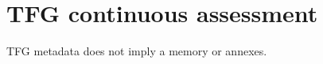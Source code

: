 \documentclass[TFG,PAC,no-cover,no-toc]{P3CTeX}
\begin{document}
\section{TFG continuous assessment}
TFG metadata does not imply a memory or annexes.
\end{document}
